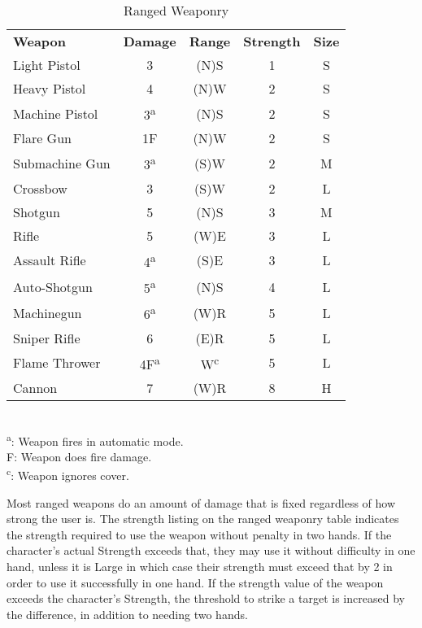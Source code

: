 \begin{wraptable}[18]{R}{10cm}\vspace{-1.5cm}
 \caption{Ranged Weaponry} \centering
\begin{tabular}{l c c c c}
\textbf{Weapon} & \textbf{Damage} & \textbf{Range} & \textbf{Strength} & \textbf{Size}\\
Light Pistol & 3 & (N)S & 1 & S\\
Heavy Pistol & 4 & (N)W & 2 & S\\
Machine Pistol & 3\textsuperscript{a} & (N)S & 2 & S\\ 
Flare Gun & 1F & (N)W & 2 & S\\
Submachine Gun & 3\textsuperscript{a} & (S)W & 2 & M\\
Crossbow & 3 & (S)W & 2 & L\\
Shotgun & 5 & (N)S & 3 & M\\
Rifle & 5 & (W)E & 3 & L\\
Assault Rifle & 4\textsuperscript{a} & (S)E & 3 & L\\
Auto-Shotgun & 5\textsuperscript{a} & (N)S & 4 & L\\
Machinegun & 6\textsuperscript{a} & (W)R & 5 & L\\
Sniper Rifle & 6 & (E)R & 5 & L\\
Flame Thrower & 4F\textsuperscript{a} & W\textsuperscript{c} & 5 & L\\
Cannon & 7 & (W)R & 8 & H\\
\end{tabular}\\
\textsuperscript{a}: Weapon fires in automatic mode.\\
F: Weapon does fire damage.\\
\textsuperscript{c}: Weapon ignores cover.\\
\end{wraptable}

\hspace{\parindent} Most ranged weapons do an amount of damage that is fixed regardless of how strong the user is. The strength listing on the ranged weaponry table indicates the strength required to use the weapon without penalty in two hands. If the character's actual Strength exceeds that, they may use it without difficulty in one hand, unless it is Large in which case their strength must exceed that by 2 in order to use it successfully in one hand. If the strength value of the weapon exceeds the character's Strength, the threshold to strike a target is increased by the difference, in addition to needing two hands.


